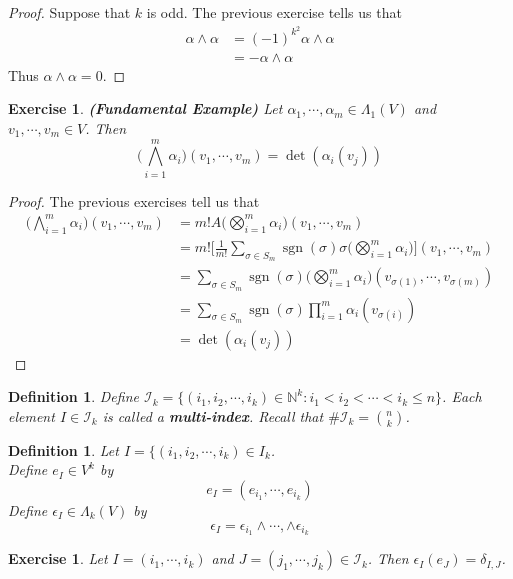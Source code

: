 \documentclass[12pt]{amsart}
\newtheorem{defn}[thm]{Definition}
\newtheorem{ex}[thm]{Exercise}
\newcommand{\al}{\alpha}
\newcommand{\del}{\delta}
\newcommand{\Lam}{\Lambda}
\newcommand{\ep}{\epsilon}
\newcommand{\sig}{\sigma}
\newcommand{\N}{\mathbb{N}}
\newcommand{\MI}{\mathcal{I}}
\DeclareMathOperator{\sgn}{sgn}
\begin{document}
	\begin{proof}
		Suppose that $k$ is odd. The previous exercise tells us that 
		\begin{align*}
			\al \wedge \al 
			&= (-1)^{k^2} \al \wedge \al \\
			&= -\al \wedge \al
		\end{align*}
		Thus $\al \wedge \al = 0$.
	\end{proof}
	
	\begin{ex}\textbf{(Fundamental Example)}
		Let $\al_1, \cdots, \al_m \in \Lam_1(V)$ and $v_1, \cdots, v_m \in V$. Then $$\bigg( \bigwedge_{i=1}^m \al_i \bigg)(v_1, \cdots, v_m) = \det (\al_i (v_j))$$
	\end{ex}

	\begin{proof}
		The previous exercises tell us that
		\begin{align*}
			\bigg( \bigwedge_{i=1}^m \al_i \bigg)(v_1, \cdots, v_m)
			&= m! A\bigg( \bigotimes_{i=1}^m \al_i \bigg) (v_1, \cdots, v_m) \\
			&= m! \bigg[ \frac{1}{m!} \sum_{\sig \in S_{m}} \sgn(\sig) \sig \bigg(\bigotimes_{i=1}^m \al_i \bigg) \bigg] (v_1, \cdots, v_m) \\
			&= \sum_{\sig \in S_{m}} \sgn(\sig)  \bigg(\bigotimes_{i=1}^m \al_i \bigg) (v_{\sig(1)}, \cdots, v_{\sig(m)}) \\
			&= \sum_{\sig \in S_{m}} \sgn(\sig)  \prod_{i=1}^m \al_i(v_{\sig(i)})   \\
			&= \det (\al_i (v_j))
		\end{align*}
	\end{proof}

	\begin{defn}
		Define $\MI_{k} = \{(i_1, i_2, \cdots, i_k) \in \N^k: i_1 < i_2 < \cdots < i_k \leq n \}$. Each element $I \in \MI_{k}$ is called a \textbf{multi-index}. Recall that $\# \MI_{k} = {n \choose k}$. 
	\end{defn}

	\begin{defn}
		Let $I = \{(i_1, i_2, \cdots, i_k) \in I_k$. \\ Define $e_I \in V^k$ by $$e_I = (e_{i_1}, \cdots, e_{i_k})$$ Define $\ep_I \in \Lam_k(V)$ by $$ \ep_I = \ep_{i_1} \wedge \cdots, \wedge \ep_{i_k} $$ 
	\end{defn}

	\begin{ex}
		Let $I = (i_1, \cdots, i_k)$ and $J = (j_1, \cdots, j_k) \in \MI_k$. Then $\ep_I(e_J) = \del_{I,J}$.
	\end{ex}
\end{document}
